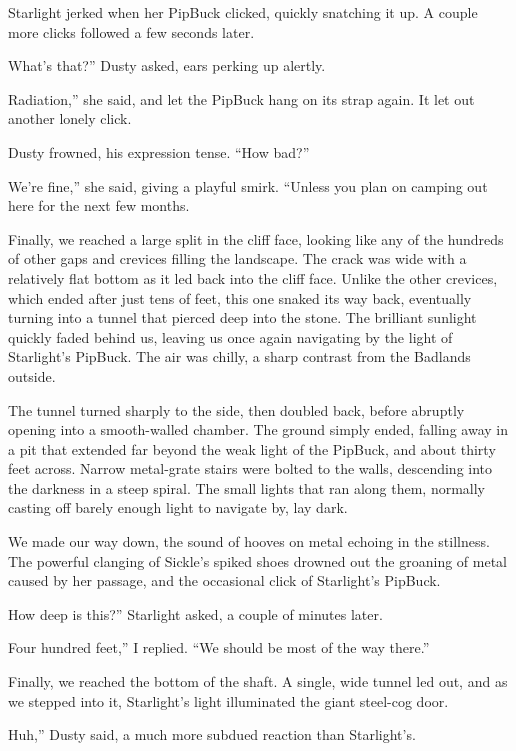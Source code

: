 Starlight jerked when her PipBuck clicked, quickly snatching it up. A couple more clicks followed a few seconds later.

\leavevmode{}What’s that?” Dusty asked, ears perking up alertly.

\leavevmode{}Radiation,” she said, and let the PipBuck hang on its strap again. It let out another lonely click.

Dusty frowned, his expression tense. “How bad?”

\leavevmode{}We’re fine,” she said, giving a playful smirk. “Unless you plan on camping out here for the next few months.

Finally, we reached a large split in the cliff face, looking like any of the hundreds of other gaps and crevices filling the landscape. The crack was wide with a relatively flat bottom as it led back into the cliff face. Unlike the other crevices, which ended after just tens of feet, this one snaked its way back, eventually turning into a tunnel that pierced deep into the stone. The brilliant sunlight quickly faded behind us, leaving us once again navigating by the light of Starlight’s PipBuck. The air was chilly, a sharp contrast from the Badlands outside.

The tunnel turned sharply to the side, then doubled back, before abruptly opening into a smooth-walled chamber. The ground simply ended, falling away in a pit that extended far beyond the weak light of the PipBuck, and about thirty feet across. Narrow metal-grate stairs were bolted to the walls, descending into the darkness in a steep spiral. The small lights that ran along them, normally casting off barely enough light to navigate by, lay dark.

We made our way down, the sound of hooves on metal echoing in the stillness. The powerful clanging of Sickle’s spiked shoes drowned out the groaning of metal caused by her passage, and the occasional click of Starlight’s PipBuck.

\leavevmode{}How deep is this?” Starlight asked, a couple of minutes later.

\leavevmode{}Four hundred feet,” I replied. “We should be most of the way there.”

Finally, we reached the bottom of the shaft. A single, wide tunnel led out, and as we stepped into it, Starlight’s light illuminated the giant steel-cog door.

\leavevmode{}Huh,” Dusty said, a much more subdued reaction than Starlight’s.

